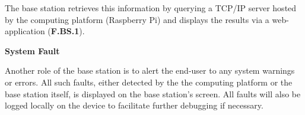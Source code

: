 The base station retrieves this information by querying a TCP/IP server hosted by the computing platform (Raspberry Pi) and displays the results via a web-application (\textbf{F.BS.1}).

\textbf{System Fault}

Another role of the base station is to alert the end-user to any system warnings or errors. All such faults, either detected by the the computing platform or the base station itself, is displayed on the base station's screen. All faults will also be logged locally on the device to facilitate further debugging if necessary.
